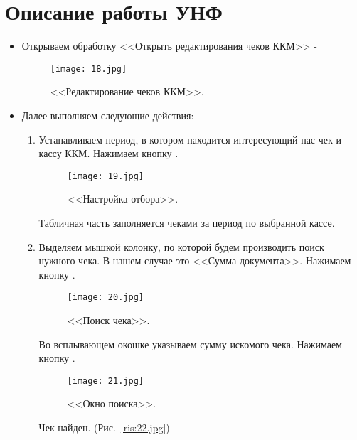 \section{Описание работы УНФ}

\begin{itemize}	
	\item Открываем обработку <<Открыть редактирования чеков ККМ>>  - 
	
	
	\begin{figure}[H]
		\texttt{[image: 18.jpg]}
		\caption{<<Редактирование чеков ККМ>>.}
		\label{ris:18.jpg}
	\end{figure}

	\item Далее выполняем следующие действия:
	
	\begin{enumerate}[label={\alph*)},font={\color{red!50!black}\bfseries}] 
		
		\item Устанавливаем период, в котором находится интересующий нас чек и кассу ККМ. Нажимаем кнопку .
		
		\begin{figure}[H]
			\texttt{[image: 19.jpg]}
			\caption{<<Настройка отбора>>.}
			\label{ris:19.jpg}
		\end{figure}
		
		Табличная часть заполняется чеками за период по выбранной кассе.
		
		\item Выделяем мышкой колонку, по которой будем производить поиск нужного чека. В нашем случае это <<Сумма документа>>. Нажимаем кнопку .
		
		\begin{figure}[H]
			\texttt{[image: 20.jpg]}
			\caption{<<Поиск чека>>.}
			\label{ris:20.jpg}
		\end{figure}
	
		Во всплывающем окошке указываем сумму искомого чека. Нажимаем кнопку .	
		
		\begin{figure}[H]
			\texttt{[image: 21.jpg]}
			\caption{<<Окно поиска>>.}
			\label{ris:21.jpg}
		\end{figure}
		
		Чек найден. (Рис.~\ref{ris:22.jpg})
		

\end{enumerate}
\end{itemize}
